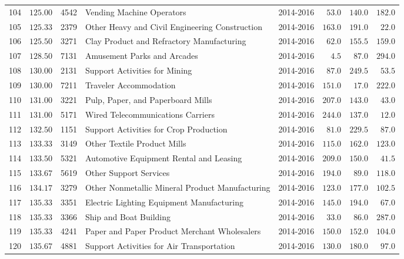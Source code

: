 \documentclass[9pt, oneside]{article}   	%
\begin{document}
\begin{longtable}{cccp{2.0in}cccc}
104  & $125.00$ & 4542 & Vending Machine Operators & 2014-2016 & $\phantom{0}53.0$ & $140.0$ & $182.0$ \\
105  & $125.33$ & 2379 & Other Heavy and Civil Engineering Construction & 2014-2016 & $163.0$ & $191.0$ & $\phantom{0}22.0$ \\
106  & $125.50$ & 3271 & Clay Product and Refractory Manufacturing & 2014-2016 & $\phantom{0}62.0$ & $155.5$ & $159.0$ \\
107  & $128.50$ & 7131 & Amusement Parks and Arcades & 2014-2016 & $\phantom{00}4.5$ & $\phantom{0}87.0$ & $294.0$ \\
108  & $130.00$ & 2131 & Support Activities for Mining & 2014-2016 & $\phantom{0}87.0$ & $249.5$ & $\phantom{0}53.5$ \\
109  & $130.00$ & 7211 & Traveler Accommodation & 2014-2016 & $151.0$ & $\phantom{0}17.0$ & $222.0$ \\
110  & $131.00$ & 3221 & Pulp, Paper, and Paperboard Mills & 2014-2016 & $207.0$ & $143.0$ & $\phantom{0}43.0$ \\
111  & $131.00$ & 5171 & Wired Telecommunications Carriers & 2014-2016 & $244.0$ & $137.0$ & $\phantom{0}12.0$ \\
112  & $132.50$ & 1151 & Support Activities for Crop Production & 2014-2016 & $\phantom{0}81.0$ & $229.5$ & $\phantom{0}87.0$ \\
113  & $133.33$ & 3149 & Other Textile Product Mills & 2014-2016 & $115.0$ & $162.0$ & $123.0$ \\
114  & $133.50$ & 5321 & Automotive Equipment Rental and Leasing & 2014-2016 & $209.0$ & $150.0$ & $\phantom{0}41.5$ \\
115  & $133.67$ & 5619 & Other Support Services & 2014-2016 & $194.0$ & $\phantom{0}89.0$ & $118.0$ \\
116  & $134.17$ & 3279 & Other Nonmetallic Mineral Product Manufacturing & 2014-2016 & $123.0$ & $177.0$ & $102.5$ \\
117  & $135.33$ & 3351 & Electric Lighting Equipment Manufacturing & 2014-2016 & $145.0$ & $194.0$ & $\phantom{0}67.0$ \\
118  & $135.33$ & 3366 & Ship and Boat Building & 2014-2016 & $\phantom{0}33.0$ & $\phantom{0}86.0$ & $287.0$ \\
119  & $135.33$ & 4241 & Paper and Paper Product Merchant Wholesalers & 2014-2016 & $150.0$ & $152.0$ & $104.0$ \\
120  & $135.67$ & 4881 & Support Activities for Air Transportation & 2014-2016 & $130.0$ & $180.0$ & $\phantom{0}97.0$ \\

\end{longtable}
\end{document}
